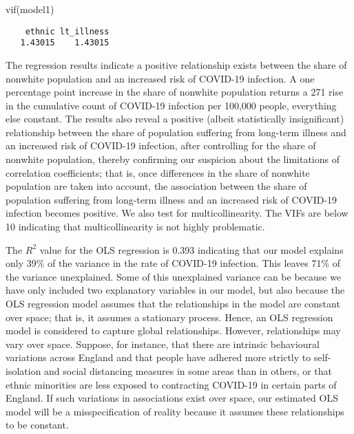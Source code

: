 \documentclass[
  letterpaper,
  krantz2]{style/krantz}
\newenvironment{Shaded}{\begin{snugshade}}{\end{snugshade}}
\newcommand{\FunctionTok}[1]{\textcolor[rgb]{0.28,0.35,0.67}{#1}}
\newcommand{\NormalTok}[1]{\textcolor[rgb]{0.00,0.23,0.31}{#1}}
\begin{document}
\begin{Shaded}
\begin{Highlighting}[]
\FunctionTok{vif}\NormalTok{(model1)}
\end{Highlighting}
\end{Shaded}

\begin{verbatim}
    ethnic lt_illness 
   1.43015    1.43015 
\end{verbatim}

The regression results indicate a positive relationship exists between
the share of nonwhite population and an increased risk of COVID-19
infection. A one percentage point increase in the share of nonwhite
population returns a 271 rise in the cumulative count of COVID-19
infection per 100,000 people, everything else constant. The results also
reveal a positive (albeit statistically insignificant) relationship
between the share of population suffering from long-term illness and an
increased risk of COVID-19 infection, after controlling for the share of
nonwhite population, thereby confirming our suspicion about the
limitations of correlation coefficients; that is, once differences in
the share of nonwhite population are taken into account, the association
between the share of population suffering from long-term illness and an
increased risk of COVID-19 infection becomes positive. We also test for
multicollinearity. The VIFs are below 10 indicating that
multicollinearity is not highly problematic.

The \(R^{2}\) value for the OLS regression is 0.393 indicating that our
model explains only 39\% of the variance in the rate of COVID-19
infection. This leaves 71\% of the variance unexplained. Some of this
unexplained variance can be because we have only included two
explanatory variables in our model, but also because the OLS regression
model assumes that the relationships in the model are constant over
space; that is, it assumes a stationary process. Hence, an OLS
regression model is considered to capture global relationships. However,
relationships may vary over space. Suppose, for instance, that there are
intrinsic behavioural variations across England and that people have
adhered more strictly to self-isolation and social distancing measures
in some areas than in others, or that ethnic minorities are less exposed
to contracting COVID-19 in certain parts of England. If such variations
in associations exist over space, our estimated OLS model will be a
misspecification of reality because it assumes these relationships to be
constant.
\end{document}
